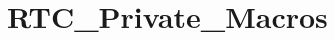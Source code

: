 \hypertarget{group___r_t_c___private___macros}{\section{R\-T\-C\-\_\-\-Private\-\_\-\-Macros}
\label{group___r_t_c___private___macros}
}
